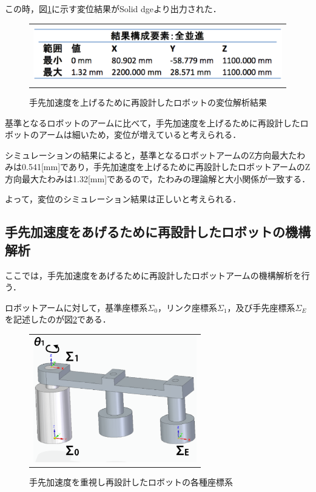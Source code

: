 この時，図\ref{light-heni-result}に示す変位結果がSolid
dgeより出力された．

\begin{figure}[htbp]
  \begin{center}
    \begin{tabular}{c}
      \includegraphics[height=2.5cm]{img/eps/light-heni-result.eps}
    \end{tabular}
    \caption{手先加速度を上げるために再設計したロボットの変位解析結果}
    \label{light-heni-result}
  \end{center}
\end{figure}

基準となるロボットのアームに比べて，手先加速度を上げるために再設計したロボットのアームは細いため，変位が増えていると考えられる．

シミュレーションの結果によると，基準となるロボットアームのZ方向最大たわみは0.541{[}mm{]}であり，手先加速度を上げるために再設計したロボットアームのZ方向最大たわみは1.32{[}mm{]}であるので，たわみの理論解と大小関係が一致する．

よって，変位のシミュレーション結果は正しいと考えられる．

\subsection{手先加速度をあげるために再設計したロボットの機構解析}\label{ux624bux5148ux52a0ux901fux5ea6ux3092ux3042ux3052ux308bux305fux3081ux306bux518dux8a2dux8a08ux3057ux305fux30edux30dcux30c3ux30c8ux306eux6a5fux69cbux89e3ux6790}

ここでは，手先加速度をあげるために再設計したロボットアームの機構解析を行う．

ロボットアームに対して，基準座標系\(\Sigma_0\)，リンク座標系\(\Sigma_1\)，及び手先座標系\(\Sigma_E\)を記述したのが図\ref{light-tesaki}である．

\begin{figure}[htbp]
  \begin{center}
    \begin{tabular}{c}
      \includegraphics[height=5.5cm]{img/eps/light-dh.eps}
    \end{tabular}
    \caption{手先加速度を重視し再設計したロボットの各種座標系}
    \label{light-tesaki}
  \end{center}
\end{figure}

